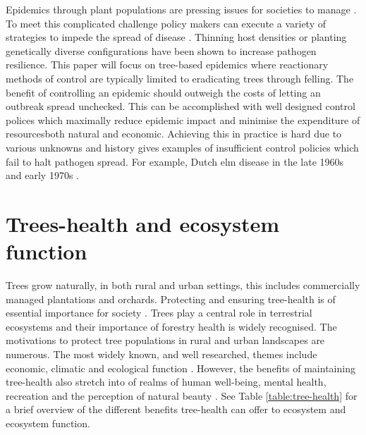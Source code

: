 Epidemics through plant populations are pressing issues for societies to manage \cite{pests-intro}. To meet this complicated challenge policy makers can execute a variety of strategies to impede the spread of disease \cite{Gilligan-disease-management}. Thinning host densities \cite{resiliency-density-reductions} or planting genetically diverse configurations \cite{burdon1982host, huang1980importance, doi:10.1094/PD-89-0969, genetic-heterogeneity} have been shown to increase pathogen resilience. This paper will focus on tree-based epidemics where reactionary methods of control are typically limited to eradicating trees through felling.
The benefit of controlling an epidemic should outweigh the costs of letting an outbreak spread unchecked. This can be accomplished with well designed control polices which maximally reduce epidemic impact and minimise the expenditure of resources\textemdash both natural and economic. Achieving this in practice is hard due to various unknowns \cite{13-challenges} and history gives examples of insufficient control policies which fail to halt pathogen spread. For example, Dutch elm disease in the late 1960s and early 1970s \cite{dutch-elm-mismanage}. 


\section{Trees-health and ecosystem function}
Trees grow naturally, in both rural and urban settings, this includes commercially managed plantations and orchards. Protecting and ensuring tree-health is of essential importance for society \cite{Boyd1235773}. Trees play a central role in terrestrial ecosystems \cite{boyd2013consequence} and their importance of forestry health is widely recognised. The motivations to protect tree populations in rural and urban landscapes are numerous. The most widely known, and well researched, themes include economic, climatic and ecological function \cite{freer2017tree}. However, the benefits of maintaining tree-health also stretch into of realms of human well-being, mental health, recreation and the perception of natural beauty \cite{tyrvainen2005benefits}. See Table \ref{table:tree-health} for a brief overview of the different benefits tree-health can offer to ecosystem and ecosystem function.\\


